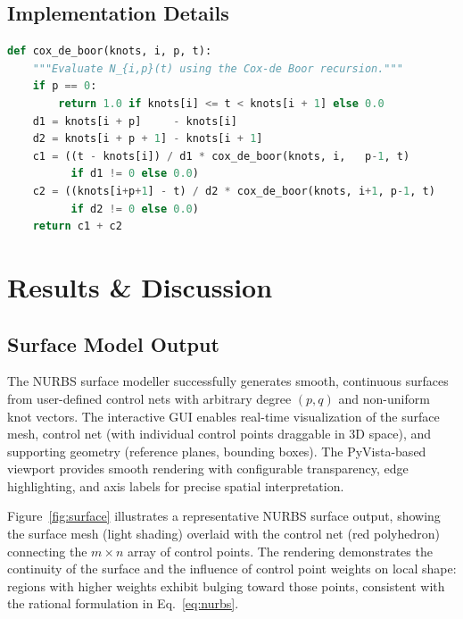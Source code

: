 \documentclass[a4paper,12pt]{article}
\begin{document}
\subsection{Implementation Details}

\begin{lstlisting}[language=Python,
                   caption={Core NURBS basis-function evaluation (relevant
                             excerpt from \texttt{nurbs\_core.py}).},
                   label={lst:python}]
def cox_de_boor(knots, i, p, t):
    """Evaluate N_{i,p}(t) using the Cox-de Boor recursion."""
    if p == 0:
        return 1.0 if knots[i] <= t < knots[i + 1] else 0.0
    d1 = knots[i + p]     - knots[i]
    d2 = knots[i + p + 1] - knots[i + 1]
    c1 = ((t - knots[i]) / d1 * cox_de_boor(knots, i,   p-1, t)
          if d1 != 0 else 0.0)
    c2 = ((knots[i+p+1] - t) / d2 * cox_de_boor(knots, i+1, p-1, t)
          if d2 != 0 else 0.0)
    return c1 + c2
\end{lstlisting}

\section{Results \& Discussion}

\subsection{Surface Model Output}

The NURBS surface modeller successfully generates smooth, continuous surfaces
from user-defined control nets with arbitrary degree $(p, q)$ and non-uniform
knot vectors. The interactive GUI enables real-time visualization of the
surface mesh, control net (with individual control points draggable in 3D
space), and supporting geometry (reference planes, bounding boxes). The
PyVista-based viewport provides smooth rendering with configurable
transparency, edge highlighting, and axis labels for precise spatial
interpretation.

Figure~\ref{fig:surface} illustrates a representative NURBS surface output,
showing the surface mesh (light shading) overlaid with the control net (red
polyhedron) connecting the $m \times n$ array of control points. The rendering
demonstrates the continuity of the surface and the influence of control point
weights on local shape: regions with higher weights exhibit bulging toward
those points, consistent with the rational formulation in Eq.~\eqref{eq:nurbs}.
\end{document}
